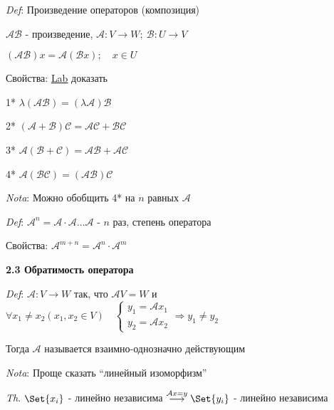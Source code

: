 \documentclass[12pt]{article}
\begin{document}
    \vspace{3mm}
\textit{Def}: Произведение операторов (композиция)

    $\mathcal{A}\mathcal{B}$ - произведение, $\mathcal{A} : V \rightarrow W; \ \mathcal{B} : U \rightarrow V$

    $(\mathcal{A}\mathcal{B}) x = \mathcal{A}(\mathcal{B}x); \quad x \in U$

    Свойства: \underline{Lab} доказать

    1* $\lambda (\mathcal{A}\mathcal{B}) = (\lambda \mathcal{A})\mathcal{B}$

    2* $(\mathcal{A} + \mathcal{B}) \mathcal{C} = \mathcal{A}\mathcal{C} + \mathcal{B}\mathcal{C}$

    3* $\mathcal{A} (\mathcal{B} + \mathcal{C}) = \mathcal{A}\mathcal{B} + \mathcal{A}\mathcal{C}$

    4* $\mathcal{A} (\mathcal{B}\mathcal{C}) = (\mathcal{A}\mathcal{B}) \mathcal{C}$


    \vspace{3mm}
\textit{Nota}: Можно обобщить 4* на $n$ равных $\mathcal{A}$

    \vspace{3mm}
\textit{Def}: $\mathcal{A}^n = \mathcal{A} \cdot \mathcal{A} \dots \mathcal{A}$ - $n$ раз, степень оператора

    Свойства: $\mathcal{A}^{m + n} = \mathcal{A}^n \cdot \mathcal{A}^m$

    \vspace{10mm}

    \textbf{2.3 Обратимость оператора}

    \vspace{3mm}
\textit{Def}: $\mathcal{A} : V \rightarrow W$ так, что $\mathcal{A}V = W$ и $\forall x_1 \neq x_2 (x_1, x_2 \in V) \quad
    \begin{cases}y_1 = \mathcal{A}x_1 \\ y_2 = \mathcal{A}x_2\end{cases} \Longrightarrow y_1 \neq y_2$

    Тогда $\mathcal{A}$ называется взаимно-однозначно действующим

    \vspace{3mm}
\textit{Nota}: Проще сказать \enquote{линейный изоморфизм}

    \vspace{3mm}
\textit{Th}. $\Set{x_i}$ - линейно независима $\stackrel{\mathcal{A}x = y}{\longrightarrow} \Set{y_i}$ - линейно независима
\end{document}
